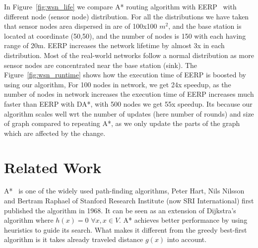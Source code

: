 \documentclass[a4paper]{article}
\begin{document}
In Figure~\ref{fig:wsn_life} we compare A* routing algorithm with EERP~\cite{WSN2014} with different node (sensor node) distribution. For all the distributions we have taken that sensor nodes area dispersed in are of 100x100 $m^2$, and the base station is located at coordinate (50,50), and the number of nodes is 150 with each having range of 20m. EERP increases the network lifetime by almost 3x in each distribution. Most of the real-world networks follow a normal distribution as more sensor nodes are concentrated near the base station (sink). The Figure~\ref{fig:wsn_runtime} shows how the execution time of EERP is boosted by using our algorithm, For 100 nodes in network, we get 24x speedup, as the number of nodes in network increases the execution time of EERP increases much faster than EERP with DA*, with 500 nodes we get 55x speedup. Its because our algorithm scales well wrt the number of updates (here number of rounds) and size of graph compared to repeating A*, as we only update the parts of the graph which are affected by the change.  



\section{Related Work}\label{sec:related_work}
A*~\cite{A*} is one of the widely used path-finding algorithms, Peter Hart, Nils Nilsson and Bertram Raphael of Stanford Research Institute (now SRI International) first published the algorithm in 1968. It can be seen as an extension of Dijkstra's algorithm where $h(x)=0 $ $\forall x, x \in V$. A* achieves better performance by using heuristics to guide its search. What makes it different from the greedy best-first algorithm is it takes already traveled distance $g(x)$ into account.
\end{document}
